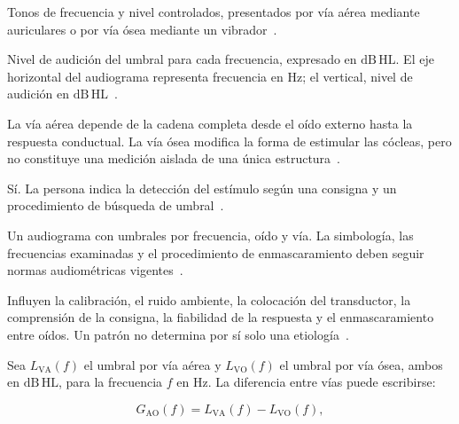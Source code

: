 \begin{description}[style=nextline]
    \item[Estímulo.]
    Tonos de frecuencia y nivel controlados, presentados por vía aérea
    mediante auriculares o por vía ósea mediante un vibrador~\cite{ashaHearingAdults,ashaPureTone2005,iso8253_1_2010}.

    \item[Magnitud registrada.]
    Nivel de audición del umbral para cada frecuencia, expresado en
    \(\mathrm{dB\,HL}\). El eje horizontal del audiograma representa
    frecuencia en \(\mathrm{Hz}\); el vertical, nivel de audición en
    \(\mathrm{dB\,HL}\)~\cite{ashaHearingAdults,ashaPureTone2005,iso8253_1_2010}.

    \item[Parte del sistema evaluada.]
    La vía aérea depende de la cadena completa desde el oído externo hasta la
    respuesta conductual. La vía ósea modifica la forma de estimular las
    cócleas, pero no constituye una medición aislada de una única estructura~\cite{ashaHearingAdults,ashaPureTone2005,iso8253_1_2010}.

    \item[Respuesta conductual.]
    Sí. La persona indica la detección del estímulo según una consigna
    y un procedimiento de búsqueda de umbral~\cite{ashaHearingAdults,ashaPureTone2005,iso8253_1_2010}.

    \item[Resultado básico esperado.]
    Un audiograma con umbrales por frecuencia, oído y vía. La
    simbología, las frecuencias examinadas y el procedimiento de
    enmascaramiento deben seguir normas audiométricas vigentes~\cite{ashaHearingAdults,ashaPureTone2005,iso8253_1_2010}.

    \item[Limitaciones generales.]
    Influyen la calibración, el ruido ambiente, la colocación del transductor,
    la comprensión de la consigna, la fiabilidad de la respuesta y el
    enmascaramiento entre oídos. Un patrón no determina por sí solo una
    etiología~\cite{ashaHearingAdults,ashaPureTone2005,iso8253_1_2010}.
\end{description}

Sea \(L_{\mathrm{VA}}(f)\) el umbral por vía aérea y
\(L_{\mathrm{VO}}(f)\) el umbral por vía ósea, ambos en
\(\mathrm{dB\,HL}\), para la frecuencia \(f\) en \(\mathrm{Hz}\). La
diferencia entre vías puede escribirse:

\begin{equation}
    G_{\mathrm{AO}}(f)
    =
    L_{\mathrm{VA}}(f)-L_{\mathrm{VO}}(f),
    \label{eq:u8-gap}
\end{equation}

